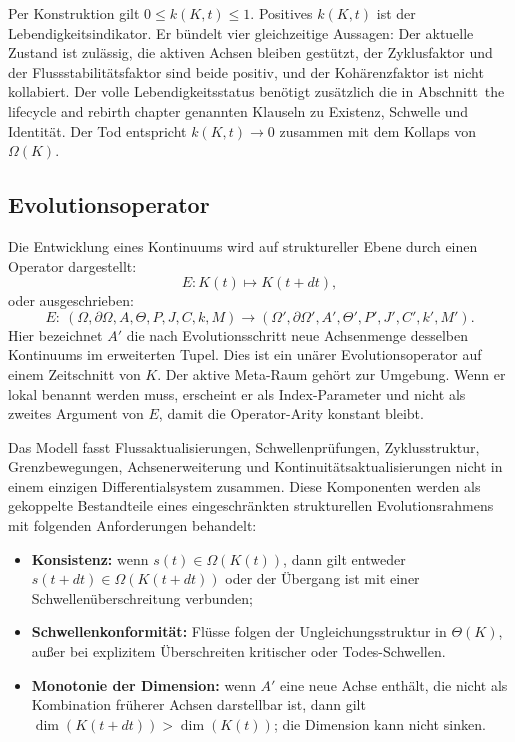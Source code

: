 Per Konstruktion gilt \(0 \le k(K,t) \le 1\).
Positives \(k(K,t)\) ist der Lebendigkeitsindikator. Er bündelt vier
gleichzeitige Aussagen: Der aktuelle Zustand ist zulässig, die aktiven Achsen
bleiben gestützt, der Zyklusfaktor und der Flussstabilitätsfaktor sind beide
positiv, und der Kohärenzfaktor ist nicht kollabiert. Der volle Lebendigkeitsstatus
benötigt zusätzlich die in Abschnitt~the lifecycle and rebirth chapter genannten Klauseln
zu Existenz, Schwelle und Identität.
Der Tod entspricht \(k(K,t)\to 0\) zusammen mit dem Kollaps von
\(\Omega(K)\).

\subsection{Evolutionsoperator}

Die Entwicklung eines Kontinuums wird auf struktureller Ebene durch einen Operator
dargestellt:
\[
    E: K(t) \mapsto K(t+dt),
\]
oder ausgeschrieben:
\[
    E:\ (\Omega,\partial\Omega,A,\Theta,P,J,C,k,M)
    \longrightarrow (\Omega',\partial\Omega',A',\Theta',P',J',C',k',M').
\]
Hier bezeichnet \(A'\) die nach Evolutionsschritt neue Achsenmenge desselben
Kontinuums im erweiterten Tupel.
Dies ist ein unärer Evolutionsoperator auf einem Zeitschnitt von \(K\). Der aktive
Meta-Raum gehört zur Umgebung. Wenn er lokal benannt werden muss, erscheint er als
Index-Parameter und nicht als zweites Argument von \(E\), damit die
Operator-Arity konstant bleibt.

Das Modell fasst Flussaktualisierungen, Schwellenprüfungen, Zyklusstruktur,
Grenzbewegungen, Achsenerweiterung und Kontinuitätsaktualisierungen nicht in
einem einzigen Differentialsystem zusammen. Diese Komponenten werden als
gekoppelte Bestandteile eines eingeschränkten strukturellen Evolutionsrahmens mit
folgenden Anforderungen behandelt:

\begin{itemize}
    \item \textbf{Konsistenz:} wenn \(s(t) \in \Omega(K(t))\), dann gilt entweder
          \(s(t+dt) \in \Omega(K(t+dt))\) oder der Übergang ist mit einer
          Schwellenüberschreitung verbunden;
    \item \textbf{Schwellenkonformität:} Flüsse folgen der Ungleichungsstruktur
          in \(\Theta(K)\), außer bei explizitem Überschreiten kritischer
          oder Todes-Schwellen.
    \item \textbf{Monotonie der Dimension:} wenn \(A'\) eine neue Achse enthält,
die nicht als Kombination früherer Achsen darstellbar ist, dann gilt
          \(\dim(K(t+dt)) > \dim(K(t))\); die Dimension kann nicht sinken.
\end{itemize}

